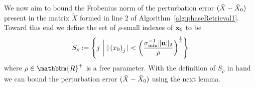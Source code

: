 We now aim to bound the Frobenius norm of the perturbation error $(\tilde{X} - \tilde{X}_0)$ present in the matrix $\tilde{X}$ formed in line 2 of Algorithm~\ref{alg:phaseRetrieval1}.
Toward this end we define the set of $\rho$-small indexes of $\mathbf x_0$ to be 
\begin{equation}
S_\rho := \left\{ j~\bigg|~ | \left( x_0 \right)_j | < \left(\frac{\sigma_{\min}^{-1} \| \mathbf n \|_2}{\rho} \right)^{\frac{1}{4}} \right\}
\label{equ:SrhoDef}
\end{equation}
where $\rho \in \mathbbm{R}^+$ is a free parameter.  
%
%
With the definition of $S_\rho$ in hand we can bound the perturbation error $(\tilde{X} - \tilde{X}_0)$ using the next lemma.
